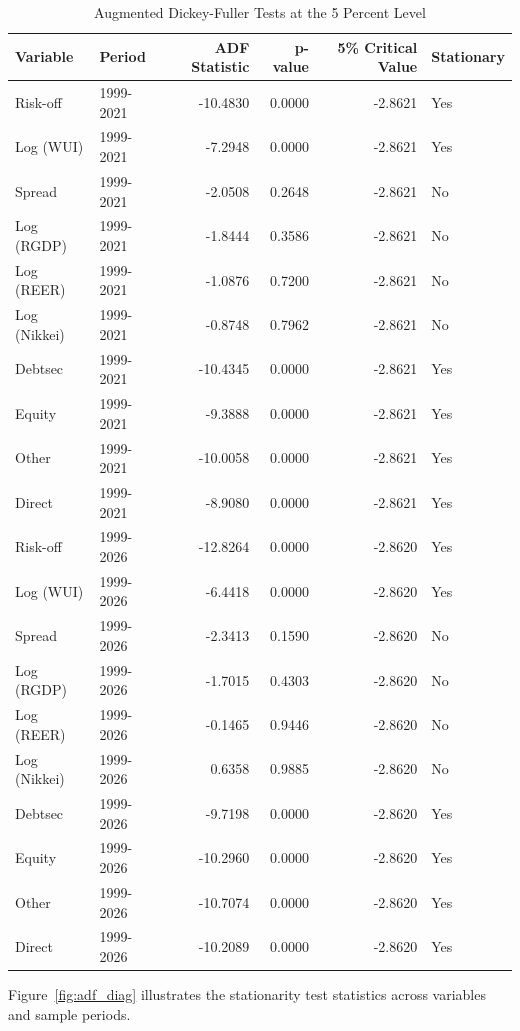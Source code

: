 \begin{table}[H]
  \centering
  \caption{Augmented Dickey-Fuller Tests at the 5 Percent Level}
  \label{tab:adf}
  \small
  \begin{tabular}{l l r r r l}
    \toprule
    Variable & Period & ADF Statistic & p-value & 5\% Critical Value & Stationary \\
    \midrule
Risk-off & 1999-2021 & -10.4830 & 0.0000 & -2.8621 & Yes \\
Log (WUI) & 1999-2021 & -7.2948 & 0.0000 & -2.8621 & Yes \\
Spread & 1999-2021 & -2.0508 & 0.2648 & -2.8621 & No \\
Log (RGDP) & 1999-2021 & -1.8444 & 0.3586 & -2.8621 & No \\
Log (REER) & 1999-2021 & -1.0876 & 0.7200 & -2.8621 & No \\
Log (Nikkei) & 1999-2021 & -0.8748 & 0.7962 & -2.8621 & No \\
Debtsec & 1999-2021 & -10.4345 & 0.0000 & -2.8621 & Yes \\
Equity & 1999-2021 & -9.3888 & 0.0000 & -2.8621 & Yes \\
Other & 1999-2021 & -10.0058 & 0.0000 & -2.8621 & Yes \\
Direct & 1999-2021 & -8.9080 & 0.0000 & -2.8621 & Yes \\
Risk-off & 1999-2026 & -12.8264 & 0.0000 & -2.8620 & Yes \\
Log (WUI) & 1999-2026 & -6.4418 & 0.0000 & -2.8620 & Yes \\
Spread & 1999-2026 & -2.3413 & 0.1590 & -2.8620 & No \\
Log (RGDP) & 1999-2026 & -1.7015 & 0.4303 & -2.8620 & No \\
Log (REER) & 1999-2026 & -0.1465 & 0.9446 & -2.8620 & No \\
Log (Nikkei) & 1999-2026 & 0.6358 & 0.9885 & -2.8620 & No \\
Debtsec & 1999-2026 & -9.7198 & 0.0000 & -2.8620 & Yes \\
Equity & 1999-2026 & -10.2960 & 0.0000 & -2.8620 & Yes \\
Other & 1999-2026 & -10.7074 & 0.0000 & -2.8620 & Yes \\
Direct & 1999-2026 & -10.2089 & 0.0000 & -2.8620 & Yes \\
    \bottomrule
  \end{tabular}
\end{table}

Figure~\ref{fig:adf_diag} illustrates the stationarity test statistics across variables and sample periods.

